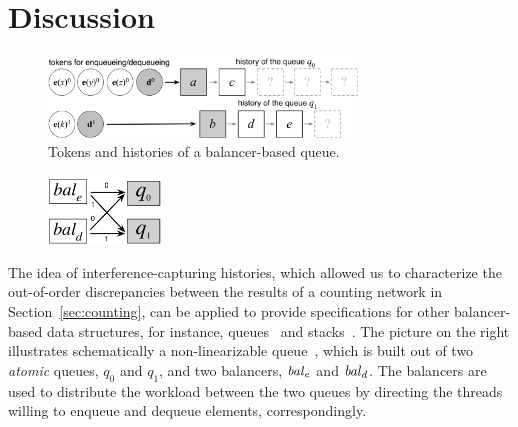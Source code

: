 \section{Discussion}
\label{sec:discussion}

%


{
\setlength{\belowcaptionskip}{-10pt}
\begin{figure}
\centering
\includegraphics[width=8.2cm]{chist2.pdf}      
\caption{Tokens and histories of a balancer-based queue.}
\label{fig:chist2}
\end{figure}
}


%
\begin{figure}   
\centering 
\includegraphics[width=3.0cm]{queue.pdf} 
\end{figure}
%
The idea of interference-capturing histories, which allowed us to
characterize the out-of-order discrepancies between the results of a
counting network in Section~\ref{sec:counting},
%
can be applied to provide specifications for other
balancer-based data structures, for instance,
queues~\cite{Derrick-al:FM14} and
stacks~\cite{Jagadeesan-Riely:ICALP14}.
%
The picture on the right illustrates schematically a non-linearizable
queue~\cite{Derrick-al:FM14}, which is built out of two \emph{atomic}
queues, $q_0$ and $q_1$, and two balancers, $\mathit{bal}_e$ and $\mathit{bal}_d$.
The balancers are used to distribute the workload between the two
queues by directing the threads willing to enqueue and dequeue
elements, correspondingly.

